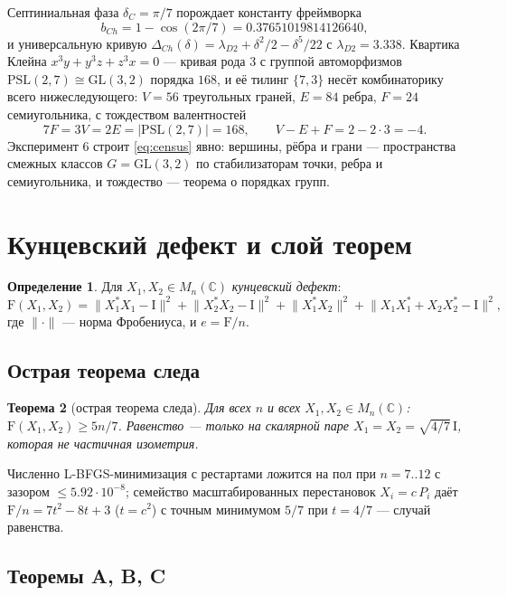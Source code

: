 \documentclass[11pt,a4paper]{article}
\newtheorem{theorem}{Теорема}
\theoremstyle{definition}
\newtheorem{definition}[theorem]{Определение}
\newcommand{\F}{\mathrm{F}}
\newcommand{\norm}[1]{\lVert #1\rVert}
\begin{document}
Септиниальная фаза $\delta_C = \pi/7$ порождает константу фреймворка
\[
b_{Ch} = 1-\cos(2\pi/7) = 0.37651019814126640,
\]
и универсальную кривую $\Delta_{Ch}(\delta) = \lambda_{D2} +
\delta^2/2 - \delta^5/22$ с $\lambda_{D2} = 3.338$. Квартика Клейна
$x^3y + y^3z + z^3x = 0$ --- кривая рода 3 с группой автоморфизмов
$\mathrm{PSL}(2,7) \cong \mathrm{GL}(3,2)$ порядка $168$, и её тилинг
$\{7,3\}$ несёт комбинаторику всего нижеследующего: $V = 56$
треугольных граней, $E = 84$ ребра, $F = 24$ семиугольника, с
тождеством валентностей
\begin{equation}
7F = 3V = 2E = |\mathrm{PSL}(2,7)| = 168,
\qquad V-E+F = 2-2\cdot 3 = -4.
\label{eq:census}
\end{equation}
Эксперимент 6 строит \eqref{eq:census} явно: вершины, рёбра и грани ---
пространства смежных классов $G = \mathrm{GL}(3,2)$ по стабилизаторам
точки, ребра и семиугольника, и тождество --- теорема о порядках групп.

\section{Кунцевский дефект и слой теорем}\label{sec:theorems}

\begin{definition}
Для $X_1, X_2 \in M_n(\mathbb{C})$ \emph{кунцевский дефект}:
\[
\F(X_1,X_2) = \norm{X_1^*X_1-\mathrm{I}}^2 + \norm{X_2^*X_2-\mathrm{I}}^2
+ \norm{X_1^*X_2}^2 + \norm{X_1X_1^* + X_2X_2^* - \mathrm{I}}^2 ,
\]
где $\norm{\cdot}$ --- норма Фробениуса, и $e = \F/n$.
\end{definition}

\subsection{Острая теорема следа}

\begin{theorem}[острая теорема следа]\label{thm:trace}
Для всех $n$ и всех $X_1, X_2 \in M_n(\mathbb{C})$:
$\F(X_1,X_2) \ge 5n/7$. Равенство --- только на скалярной паре
$X_1 = X_2 = \sqrt{4/7}\,\mathrm{I}$, которая не частичная изометрия.
\end{theorem}

Численно L-BFGS-минимизация с рестартами ложится на пол при $n = 7..12$
с зазором $\le 5.92\cdot 10^{-8}$; семейство масштабированных
перестановок $X_i = c\,P_i$ даёт $\F/n = 7t^2 - 8t + 3$ ($t = c^2$) с
точным минимумом $5/7$ при $t = 4/7$ --- случай равенства.

\subsection{Теоремы A, B, C}
\end{document}
